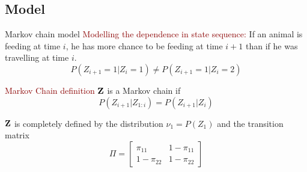 \documentclass{beamer}\usepackage[]{graphicx}\usepackage[]{color}
\newcommand{\emphase}[1]{\textcolor{darkred}{#1}}
\newcommand{\paragraph}[1]{\emphase{#1}}
\newcommand{\Zbf}{{\bf Z}}
\begin{document}
\subsection*{Model}
\begin{frame}{Markov chain model}
\paragraph{Modelling the dependence in state sequence:}
If an animal is feeding at time $i$, he has more chance to be feeding at time $i+1$ than if he was travelling at time $i$.
$$P(Z_{i+1}=1 \vert Z_{i}=1) \ne P(Z_{i+1}=1 \vert Z_{i}=2)$$

\paragraph{Markov Chain definition}
$\Zbf$ is a Markov chain if 
$$P(Z_{i+1} \vert Z_{1:i}) =  P(Z_{i+1} \vert Z_{i})$$


$\Zbf$ is completely defined by the distribution $\nu_1=P(Z_1)$ and the transition matrix
$$\Pi =\left[\begin{matrix}
\pi_{11} & 1-\pi_{11}\\
1-\pi_{22} & 1-\pi_{22}
\end{matrix}\right]$$
\end{frame}
\end{document}
